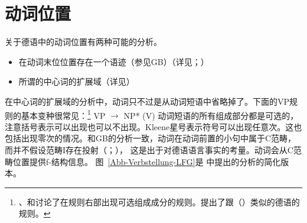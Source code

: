 \section{动词位置}
\label{Abschnitt-Verbstellung-LFG}

关于德语中的动词位置有两种可能的分析。
\begin{sloppypar}
\begin{itemize}
\item 在动词末位位置存在一个语迹（参见GB\indexgbc）（详见\citealp{Choi99a-u}；\citealp[\S~2.1.4]{Berman96a-u}） 
\item 所谓的中心词的扩展域（详见\citealp{Berman2003a}）
\end{itemize}
\end{sloppypar}

{}
在中心词的扩展域的分析中，动词只不过是从动词短语中省略掉了。下面的VP规则的基本变种很常见：\footnote{%
 、\citet[]{ZK2002a}和讨论了在规则右部出现可选组成成分的规则。\citet[]{ZK2002a}提出了跟（）类似的德语的规则。%
}
\ea
\label{Regel-LFG-VP-alles-optional}
VP $\to$ NP* (V)
\z
动词短语的所有组成部分都是可选的，注意括号表示可以出现也可以不出现。Kleene星号\isce{*}{*}表示符号可以出现任意次。这也包括出现零次的情况。和GB的分析一致，动词在动词前置的小句中属于C范畴，而并不假设范畴I存在投射（\citealp{Haider93a,Haider95b-u,Haider97a}；\citealp[\S~IV.3]{Sternefeld2006a-u}），
这是出于对德语语言事实的考量\citep[\S~3.2.2]{Berman2003a}。动词会从C范畴位置提供f-结构信息。
图~\vref{Abb-Verbstellung-LFG}是 \citet[]{Berman2003a}中提出的分析的简化版本。
 
